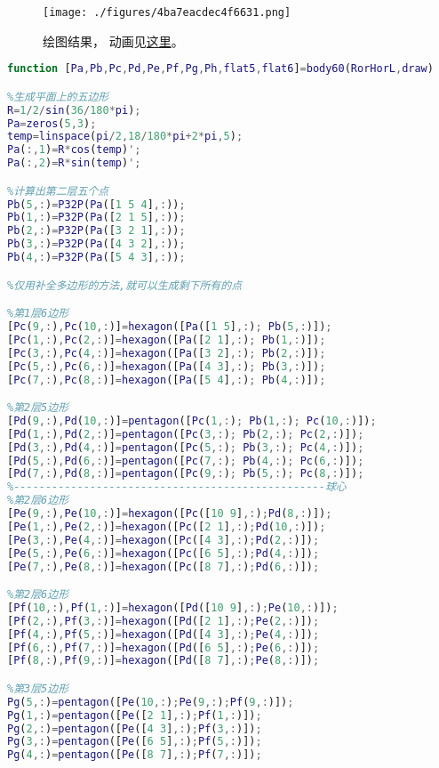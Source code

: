 
\begin{issues}
\issueDraft
\end{issues}


\begin{figure}[ht]
\centering
\texttt{[image: ./figures/4ba7eacdec4f6631.png]}
\caption{绘图结果， 动画见\href{https://wuli.wiki/apps/football.html}{这里}。} \label{fig_foot60_1}
\end{figure}

\begin{lstlisting}[language=matlab, caption=body60.m]
function [Pa,Pb,Pc,Pd,Pe,Pf,Pg,Ph,flat5,flat6]=body60(RorHorL,draw)

%生成平面上的五边形
R=1/2/sin(36/180*pi);
Pa=zeros(5,3); 
temp=linspace(pi/2,18/180*pi+2*pi,5);
Pa(:,1)=R*cos(temp)';
Pa(:,2)=R*sin(temp)';

%计算出第二层五个点
Pb(5,:)=P32P(Pa([1 5 4],:));
Pb(1,:)=P32P(Pa([2 1 5],:));
Pb(2,:)=P32P(Pa([3 2 1],:));
Pb(3,:)=P32P(Pa([4 3 2],:));
Pb(4,:)=P32P(Pa([5 4 3],:));

%仅用补全多边形的方法,就可以生成剩下所有的点

%第1层6边形
[Pc(9,:),Pc(10,:)]=hexagon([Pa([1 5],:); Pb(5,:)]);
[Pc(1,:),Pc(2,:)]=hexagon([Pa([2 1],:); Pb(1,:)]);
[Pc(3,:),Pc(4,:)]=hexagon([Pa([3 2],:); Pb(2,:)]);
[Pc(5,:),Pc(6,:)]=hexagon([Pa([4 3],:); Pb(3,:)]);
[Pc(7,:),Pc(8,:)]=hexagon([Pa([5 4],:); Pb(4,:)]);

%第2层5边形
[Pd(9,:),Pd(10,:)]=pentagon([Pc(1,:); Pb(1,:); Pc(10,:)]);
[Pd(1,:),Pd(2,:)]=pentagon([Pc(3,:); Pb(2,:); Pc(2,:)]);
[Pd(3,:),Pd(4,:)]=pentagon([Pc(5,:); Pb(3,:); Pc(4,:)]);
[Pd(5,:),Pd(6,:)]=pentagon([Pc(7,:); Pb(4,:); Pc(6,:)]);
[Pd(7,:),Pd(8,:)]=pentagon([Pc(9,:); Pb(5,:); Pc(8,:)]);
%-------------------------------------------------球心
%第2层6边形
[Pe(9,:),Pe(10,:)]=hexagon([Pc([10 9],:);Pd(8,:)]);
[Pe(1,:),Pe(2,:)]=hexagon([Pc([2 1],:);Pd(10,:)]);
[Pe(3,:),Pe(4,:)]=hexagon([Pc([4 3],:);Pd(2,:)]);
[Pe(5,:),Pe(6,:)]=hexagon([Pc([6 5],:);Pd(4,:)]);
[Pe(7,:),Pe(8,:)]=hexagon([Pc([8 7],:);Pd(6,:)]);

%第2层6边形
[Pf(10,:),Pf(1,:)]=hexagon([Pd([10 9],:);Pe(10,:)]);
[Pf(2,:),Pf(3,:)]=hexagon([Pd([2 1],:);Pe(2,:)]);
[Pf(4,:),Pf(5,:)]=hexagon([Pd([4 3],:);Pe(4,:)]);
[Pf(6,:),Pf(7,:)]=hexagon([Pd([6 5],:);Pe(6,:)]);
[Pf(8,:),Pf(9,:)]=hexagon([Pd([8 7],:);Pe(8,:)]);

%第3层5边形
Pg(5,:)=pentagon([Pe(10,:);Pe(9,:);Pf(9,:)]);
Pg(1,:)=pentagon([Pe([2 1],:);Pf(1,:)]);
Pg(2,:)=pentagon([Pe([4 3],:);Pf(3,:)]);
Pg(3,:)=pentagon([Pe([6 5],:);Pf(5,:)]);
Pg(4,:)=pentagon([Pe([8 7],:);Pf(7,:)]);


\end{lstlisting}
